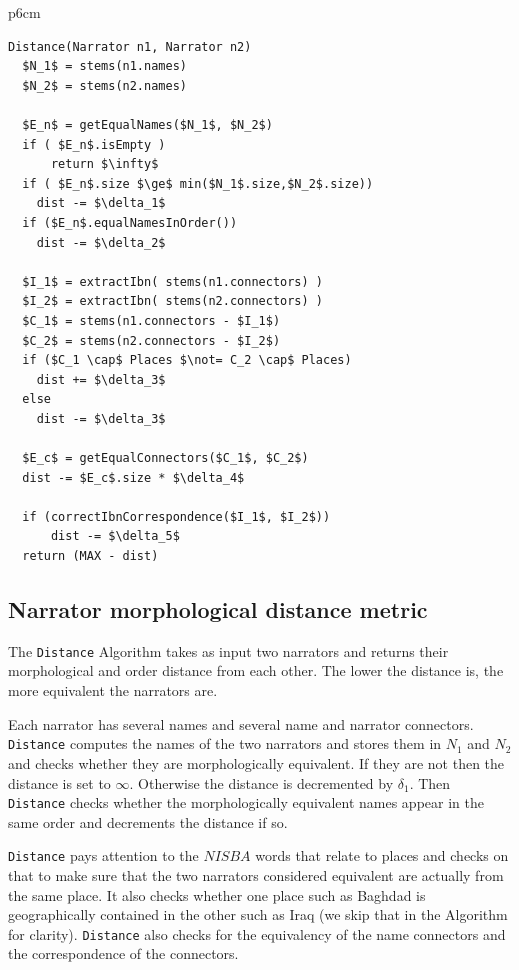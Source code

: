 \documentclass[11pt]{article}
\newcommand{\CodeIn}[1]{{\small\texttt{#1}}}
\begin{document}
\begin{table}[tb]
\begin{tabular} {p{6cm}}
\begin{Verbatim}[fontsize=\relsize{-2},
frame=topline,framesep=4mm,label=\fbox{Narrator distance metric },
commandchars=\\\{\}, codes={\catcode`$=3\catcode`_=8}]
Distance(Narrator n1, Narrator n2)
  $N_1$ = stems(n1.names)
  $N_2$ = stems(n2.names)

  $E_n$ = getEqualNames($N_1$, $N_2$)
  if ( $E_n$.isEmpty ) 
      return $\infty$
  if ( $E_n$.size $\ge$ min($N_1$.size,$N_2$.size))
    dist -= $\delta_1$
  if ($E_n$.equalNamesInOrder())  
    dist -= $\delta_2$

  $I_1$ = extractIbn( stems(n1.connectors) )
  $I_2$ = extractIbn( stems(n2.connectors) )
  $C_1$ = stems(n1.connectors - $I_1$)
  $C_2$ = stems(n2.connectors - $I_2$)
  if ($C_1 \cap$ Places $\not= C_2 \cap$ Places)
    dist += $\delta_3$
  else
    dist -= $\delta_3$

  $E_c$ = getEqualConnectors($C_1$, $C_2$)
  dist -= $E_c$.size * $\delta_4$ 

  if (correctIbnCorrespondence($I_1$, $I_2$))
      dist -= $\delta_5$
  return (MAX - dist)
\end{Verbatim}
\end{tabular}
\end{table}

\subsection{Narrator morphological distance metric}

The \CodeIn{Distance} Algorithm 
takes as input two narrators and returns 
their morphological and order distance
from each other. 
The lower the distance is, the more
equivalent the narrators are. 

Each narrator has several names and several name and 
narrator connectors. 
\CodeIn{Distance} computes the names of the two narrators
and stores them in $N_1$ and $N_2$ 
and checks whether they are morphologically equivalent. 
If they are not then the distance is set to $\infty$. 
Otherwise the distance is decremented by $\delta_1$. 
Then \CodeIn{Distance} checks whether the morphologically 
equivalent names appear in the same order and 
decrements the distance if so. 

\CodeIn{Distance}  pays attention to the $\mathit{NISBA}$ 
words that relate to places and checks on that to make sure
that the two narrators considered equivalent are actually 
from the same place. 
It also checks whether one place such as Baghdad 
is geographically 
contained in the other such as Iraq 
(we skip that in the Algorithm for clarity). 
\CodeIn{Distance} also checks for the equivalency of the
name connectors and the correspondence of the 
connectors. 
                                                         
\end{document}
